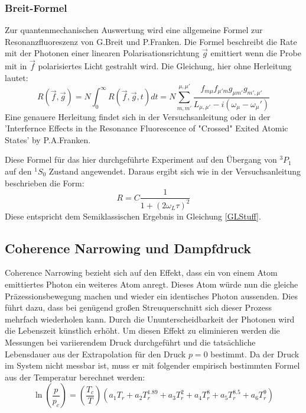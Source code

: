 \subsubsection{Breit-Formel}
Zur quantenmechanischen Auswertung wird eine allgemeine Formel zur Resonanzfluoreszenz von G.Breit und P.Franken. Die Formel beschreibt die Rate mit der Photonen einer linearen Polarisationsrichtung $\vec{g}$ emittiert wenn die Probe mit in $\vec{f}$ polarisiertes Licht gestrahlt wird. Die Gleichung, hier ohne Herleitung lautet:
\begin{equation}
	R(\vec{f},\vec{g})=N\int_{0}^{\infty}R(\vec{f},\vec{g},t)dt=N\sum_{m,m'}^{\mu,\mu'}\frac{f_{m\mu}f_{\mu'm}g_{\mu m'}g_{m',\mu'}}{L_{\mu,\mu'}-i(\omega_\mu -\omega_\mu')}
\end{equation}
Eine genauere Herleitung findet sich in der Versuchsanleitung\cite{Anleitung} oder in der 'Interfernce Effects in the Resonance Fluorescence of "Crossed" Exited Atomic States' by P.A.Franken.\cite{Franken} \par
Diese Formel für das hier durchgeführte Experiment auf den Übergang von $^3P_1$ auf den $^1S_0$ Zustand angewendet. Daraus ergibt sich wie in der Versuchsanleitung \cite{Anleitung} beschrieben die Form:
\begin{equation}
R=C\frac{1}{1+(2\omega_L\tau)^2}
\end{equation}
Diese entspricht dem Semiklassischen Ergebnis in Gleichung \ref{GLStuff}.
\subsection{Coherence Narrowing und Dampfdruck}
Coherence Narrowing bezieht sich auf den Effekt, dass ein von einem Atom emittiertes Photon ein weiteres Atom anregt. Dieses Atom würde nun die gleiche Präzessionsbewegung machen und wieder ein identisches Photon aussenden. Dies führt dazu, dass bei genügend großen Streuquerschnitt sich dieser Prozess mehrfach wiederholen kann. Durch die Ununterscheidbarkeit der Photonen wird die Lebenszeit künstlich erhöht. Um diesen Effekt zu eliminieren werden die Messungen bei variierendem Druck durchgeführt und die tatsächliche Lebensdauer aus der Extrapolation für den Druck $p = 0$ bestimmt. Da der Druck im System nicht messbar ist, muss er mit folgender empirisch bestimmten Formel aus
der Temperatur berechnet werden: 
\begin{equation}
	\ln(\frac{p}{p_c})=(\frac{T_c}{T})(a_1T_r+a_2T_r^{1.89}+a_3T_r^2+a_4T_r^8+a_5T_r^{8.5}+a_6T_r^9)
\end{equation}
